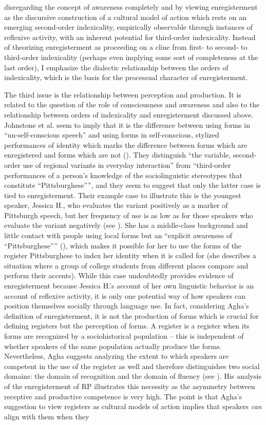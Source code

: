 disregarding the concept of awareness completely and by viewing enregisterment as the discursive construction of a cultural model of action which rests on an emerging second-order indexicality, empirically observable through instances of reflexive activity, with an inherent potential for third-order indexicality. Instead of theorizing enregisterment as proceeding on a cline from first- to second- to third-order indexicality (perhaps even implying some sort of completeness at the last order), I emphasize the dialectic relationship between the orders of indexicality, which is the basis for the processual character of enregisterment.

The third issue is the relationship between perception and production. It is related to the question of the role of consciousness and awareness and also to the relationship between orders of indexicality and enregisterment discussed above. Johnstone et al. seem to imply that it is the difference between using forms in “un-self-conscious speech” and using forms in self-conscious, stylized performances of identity which marks the difference between forms which are enregistered and forms which are not (\citeyear[97--99]{Johnstone2006}). They distinguish “the variable, second-order use of regional variants in everyday interaction” from “third-order performances of a person’s knowledge of the sociolinguistic stereotypes that constitute “Pittsburghese””, and they seem to suggest that only the latter case is tied to enregisterment. Their example case to illustrate this is the youngest speaker, Jessica H., who evaluates the variant positively as a marker of Pittsburgh speech, but her frequency of use is as low as for those speakers who evaluate the variant negatively (see ). She has a middle-class background and little contact with people using local forms but an “explicit awareness of “Pittsburghese”” (\citeyear[97]{Johnstone2006}), which makes it possible for her to use the forms of the register Pittsburghese to index her identity when it is called for (she describes a situation where a group of college students from different places compare and perform their accents). While this case undoubtedly provides evidence of enregisterment because Jessica H.’s account of her own linguistic behavior is an account of reflexive activity, it is only one potential way of how speakers can position themselves socially through language use. In fact, considering Agha’s definition of enregisterment, it is not the production of forms which is crucial for defining registers but the perception of forms. A register is a register when its forms are recognized by a sociohistorical population – this is independent of whether speakers of the same population actually produce the forms. Nevertheless, Agha suggests analyzing the extent to which speakers are competent in the use of the register as well and therefore distinguishes two social domains: the domain of recognition and the domain of fluency (see ). His analysis of the enregisterment of RP illustrates this necessity as the asymmetry between receptive and productive competence is very high. The point is that Agha’s suggestion to view registers as cultural models of action implies that speakers \emph{can} align with them when they 